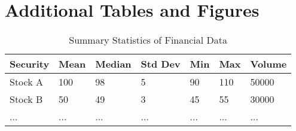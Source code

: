 \appendix
\section{Additional Tables and Figures}

\begin{table}[h]
\centering
\begin{tabular}{|l|l|l|l|l|l|l|}
\hline
\textbf{Security} & \textbf{Mean} & \textbf{Median} & \textbf{Std Dev} & \textbf{Min} & \textbf{Max} & \textbf{Volume} \\ \hline
Stock A & 100 & 98 & 5 & 90 & 110 & 50000 \\ \hline
Stock B & 50 & 49 & 3 & 45 & 55 & 30000 \\ \hline
... & ... & ... & ... & ... & ... & ... \\ \hline
\end{tabular}
\caption{Summary Statistics of Financial Data}
\label{tab:summary_statistics}
\end{table}
